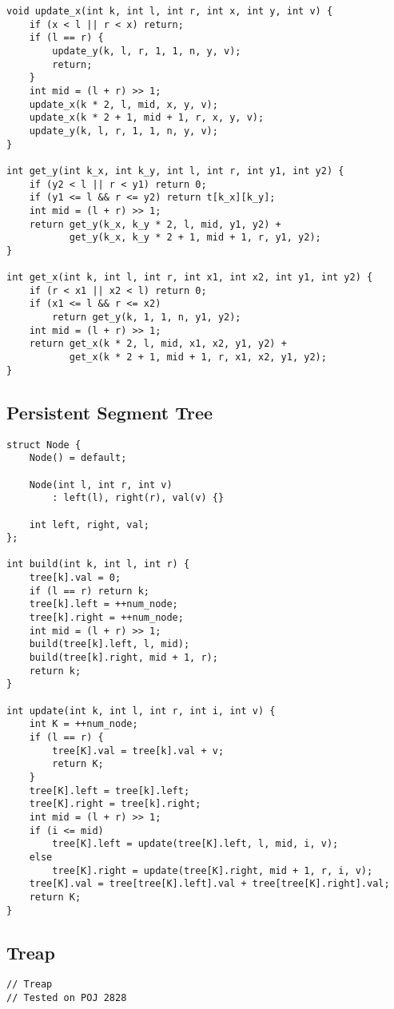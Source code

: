 \documentclass[10pt,landscape]{article}
\begin{document}
\begin{multicols}{2}
\begin{lstlisting}
void update_x(int k, int l, int r, int x, int y, int v) {
    if (x < l || r < x) return;
    if (l == r) {
        update_y(k, l, r, 1, 1, n, y, v);
        return;
    }
    int mid = (l + r) >> 1;
    update_x(k * 2, l, mid, x, y, v);
    update_x(k * 2 + 1, mid + 1, r, x, y, v);
    update_y(k, l, r, 1, 1, n, y, v);
}

int get_y(int k_x, int k_y, int l, int r, int y1, int y2) {
    if (y2 < l || r < y1) return 0;
    if (y1 <= l && r <= y2) return t[k_x][k_y];
    int mid = (l + r) >> 1;
    return get_y(k_x, k_y * 2, l, mid, y1, y2) +
           get_y(k_x, k_y * 2 + 1, mid + 1, r, y1, y2); 
}

int get_x(int k, int l, int r, int x1, int x2, int y1, int y2) {
    if (r < x1 || x2 < l) return 0;
    if (x1 <= l && r <= x2)
        return get_y(k, 1, 1, n, y1, y2);
    int mid = (l + r) >> 1;
    return get_x(k * 2, l, mid, x1, x2, y1, y2) +
           get_x(k * 2 + 1, mid + 1, r, x1, x2, y1, y2); 
}
\end{lstlisting}
\subsection{Persistent Segment Tree}
\begin{lstlisting}
struct Node {
    Node() = default;

    Node(int l, int r, int v)
        : left(l), right(r), val(v) {}

    int left, right, val;
};

int build(int k, int l, int r) {
    tree[k].val = 0;
    if (l == r) return k;
    tree[k].left = ++num_node;
    tree[k].right = ++num_node;
    int mid = (l + r) >> 1;
    build(tree[k].left, l, mid);
    build(tree[k].right, mid + 1, r);
    return k;
}

int update(int k, int l, int r, int i, int v) {
    int K = ++num_node;
    if (l == r) {
        tree[K].val = tree[k].val + v;
        return K;
    }
    tree[K].left = tree[k].left;
    tree[K].right = tree[k].right;
    int mid = (l + r) >> 1;
    if (i <= mid)
        tree[K].left = update(tree[K].left, l, mid, i, v);
    else
        tree[K].right = update(tree[K].right, mid + 1, r, i, v);
    tree[K].val = tree[tree[K].left].val + tree[tree[K].right].val;
    return K;
}
\end{lstlisting}
\subsection{Treap}
\begin{lstlisting}
// Treap
// Tested on POJ 2828


\end{lstlisting}
\end{multicols}
\end{document}
